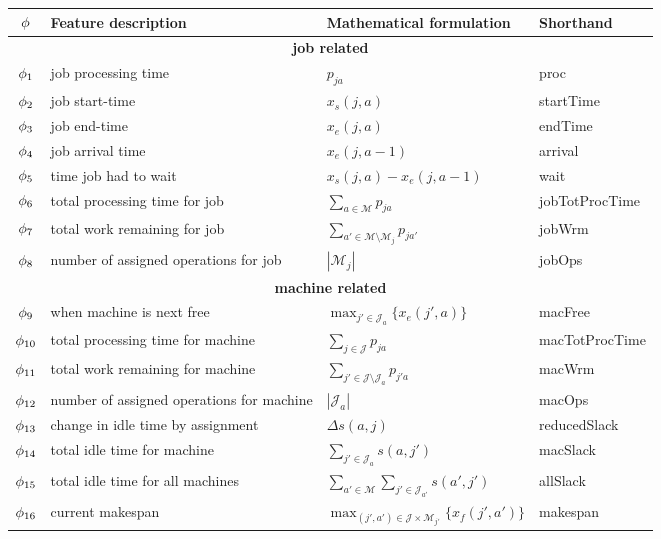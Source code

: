  {\footnotesize
 \centering
 \renewcommand{\arraystretch}{1.5}
 \begin{tabular}{clll}
	\toprule
 ${\mathbf{\phi}}$ & Feature description & Mathematical formulation & Shorthand \\ 
 \midrule
 \multicolumn{4}{c}{\textbf{job related}}\\
 $\phi_1$ & job processing time & $p_{ja}$ & proc \\
 $\phi_2$ & job start-time & $x_s(j,a)$ & startTime \\
 $\phi_3$ & job end-time & $x_e(j,a)$ & endTime \\
 $\phi_4$ & job arrival time & $x_e(j,a-1)$& arrival \\ 
 $\phi_5$ & time job had to wait & $x_s(j,a)-x_e(j,a-1)$ & wait \\ 
 $\phi_6$ & total processing time for job & $\sum_{a\in 
 \mathcal{M}}p_{ja}$ & jobTotProcTime \\
 $\phi_7$ & total work remaining for job & $\sum_{a'\in\mathcal{M}\setminus 
 \mathcal{M}_{j}}p_{ja'}$ & jobWrm \\
 $\phi_8$ & number of assigned operations for job & $|\mathcal{M}_j|$ & 
 jobOps \\ 
\midrule
 \multicolumn{4}{c}{\textbf{machine related}}\\
 $\phi_{9}$ & when machine is next free & $\max_{j'\in \mathcal{J}_a} 
 \{x_e(j',a)\}$ & macFree \\
 $\phi_{10}$ & total processing time for machine & $\sum_{j\in 
 \mathcal{J}}p_{ja}$ & macTotProcTime \\
 $\phi_{11}$ & total work remaining for machine & 
 $\sum_{j'\in\mathcal{J}\setminus \mathcal{J}_{a}}p_{j'a}$ & macWrm \\
 $\phi_{12}$ & number of assigned operations for machine & $|\mathcal{J}_a|$ & 
 macOps \\
 $\phi_{13}$ & change in idle time by assignment & $\Delta s(a,j)$ &
 reducedSlack \\
 $\phi_{14}$ & total idle time for machine & $\sum_{j'\in 
 \mathcal{J}_a}s(a,j')$ & macSlack \\
 $\phi_{15}$ & total idle time for all machines & $\sum_{a'\in  
 \mathcal{M}}\sum_{j'\in \mathcal{J}_{a'}}s(a',j')$ & allSlack \\
 $\phi_{16}$ & current makespan & $\max_{(j',a')\in \mathcal{J} \times 
 \mathcal{M}_{j'}}\{x_f(j',a')\}$ & makespan \\

\end{tabular}}
